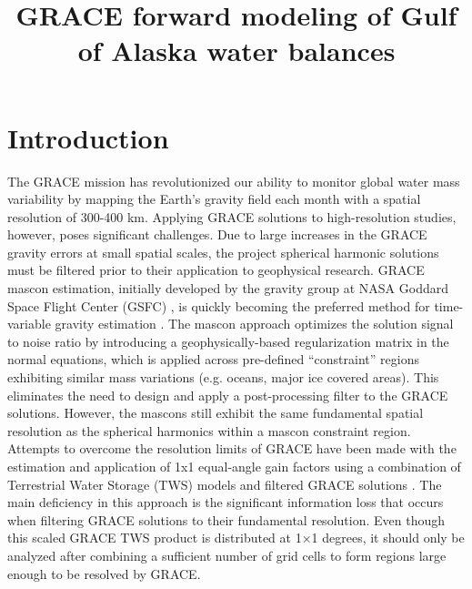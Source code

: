 \documentclass[review,oneside]{igs}
\begin{document}
\title[GRACE Forward Modeling]{GRACE forward modeling of Gulf of Alaska water balances}

\author[Arendt and others]{ }



\maketitle

\section{Introduction}

The GRACE mission has revolutionized our ability to monitor global water mass variability by mapping the Earth’s gravity field each month with a spatial resolution of 300-400 km. Applying GRACE solutions to high-resolution studies, however, poses significant challenges. Due to large increases in the GRACE gravity errors at small spatial scales, the project spherical harmonic solutions must be filtered prior to their application to geophysical research. GRACE mascon estimation, initially developed by the gravity group at NASA Goddard Space Flight Center (GSFC) \citep{rowlands_resolving_2005, sabaka_improving_2010, luthcke_antarctica_2013}, is quickly becoming the preferred method for time-variable gravity estimation \citep{watkins_improved_2015}. The mascon approach optimizes the solution signal to noise ratio by introducing a geophysically-based regularization matrix in the normal equations, which is applied across pre-defined ``constraint'' regions exhibiting similar mass variations (e.g. oceans, major ice covered areas). This eliminates the need to design and apply a post-processing filter to the GRACE solutions. However, the mascons still exhibit the same fundamental spatial resolution as the spherical harmonics within a mascon constraint region. Attempts to overcome the resolution limits of GRACE have been made with the estimation and application of 1x1 equal-angle gain factors using a combination of Terrestrial Water Storage (TWS) models and filtered GRACE solutions \citep{landerer_accuracy_2012}. The main deficiency in this approach is the significant information loss that occurs when filtering GRACE solutions to their fundamental resolution. Even though this scaled GRACE TWS product is distributed at 1×1 degrees, it should only be analyzed after combining a sufficient number of grid cells to form regions large enough to be resolved by GRACE.
\end{document}
